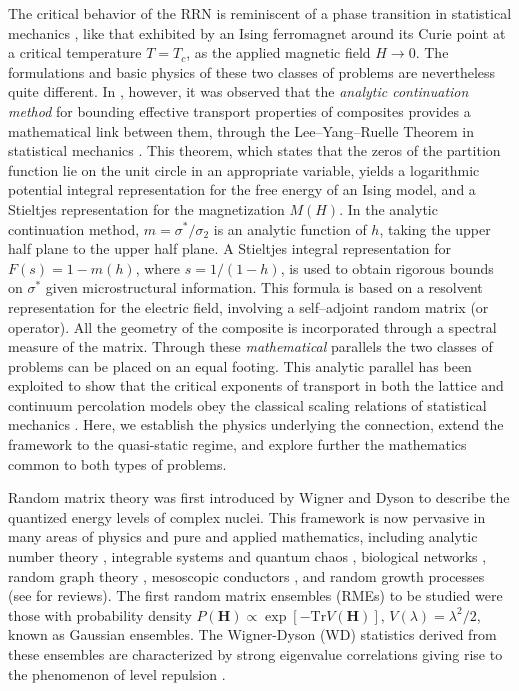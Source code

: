 \documentclass[english,12pt]{ttuthes}
\begin{document}
The critical behavior of the RRN is reminiscent of a phase transition
in statistical mechanics
\cite{Clerc:AP-191,Bergman:SSP-147,Efros:PSSB-303,Hong:PRB-4564}, like
that exhibited by an Ising ferromagnet
\cite{Thompson-1988,Christensen-2005} around its Curie point at a
critical temperature $T=T_c$, as the applied magnetic field $H\to0$. The
formulations and basic physics of these two classes of problems are
nevertheless quite different. In
\cite{Golden:JMP-5627,Golden:PRL-3935}, however, it was observed that
the \emph{analytic continuation method} for bounding effective
transport properties of composites
\cite{Bergman:PRL-1285,Milton:APL-300,Golden:CMP-473} provides a
mathematical link between them, through the Lee--Yang--Ruelle Theorem in
statistical mechanics
\cite{Yang:PR:404,Lee:PR:411,Baker-1990,Baker:PRL-990,Ruelle:PRL:303,Ruelle:AM:589}.
This theorem, which states that the zeros of the partition function
lie on the unit circle in an appropriate variable, yields a
logarithmic potential integral representation for the free energy of
an Ising model, and a Stieltjes representation for the magnetization
$M(H)$. In the analytic continuation method, $m=\sigma^*/\sigma_2$ is an
analytic function of $h$, taking the upper half plane to the upper
half plane. A Stieltjes integral representation for $F(s)=1-m(h)$,
where $s=1/(1-h)$, is used to obtain rigorous bounds on $\sigma^*$ given
microstructural information. This formula is based on a resolvent
representation for the electric field, involving a self--adjoint
random matrix (or operator). All the geometry of the composite is
incorporated through a spectral measure of the matrix. Through these
\emph{mathematical} parallels the two classes of problems can be
placed on an equal footing. This analytic parallel has been exploited
to show that the critical exponents of transport in both the lattice and
continuum percolation models obey the classical scaling relations of
statistical mechanics \cite{Golden:PRL-3935}. Here, we establish the
physics underlying the connection, extend the framework to the
quasi-static regime, and explore further the mathematics common to both
types of problems.

Random matrix theory was first introduced by Wigner and Dyson to 
describe the quantized energy levels of complex nuclei. This framework
is now pervasive in many areas of physics and pure and applied
mathematics, including analytic number theory
\cite{Mezzadri:2005:RMT_RH}, integrable systems and quantum chaos
\cite{Forrester:2010:RMT}, biological networks \cite{Luo_etal:PLA:06},
random graph theory \cite{Bandyopadhyay:PRE_SNSMP:07,Kuhn},
mesoscopic conductors \cite{Muttalib_etal_qRME}, and random growth
processes \cite{Forrester:2010:RMT} (see
\cite{Guhr,Brody_etal,Konig,Mirlin:PhysRep:259} for reviews). The
first random matrix ensembles (RMEs) to be studied were those with
probability density $P(\mathbf{H})\propto\exp[-\text{Tr}V(\mathbf{H})]$,
$V(\lambda)=\lambda^2/2$, known as Gaussian ensembles. The Wigner-Dyson (WD)
statistics derived from these ensembles are characterized by strong
eigenvalue correlations giving rise to the phenomenon of level
repulsion \cite{Mehta:2004:RMT}.
\end{document}

